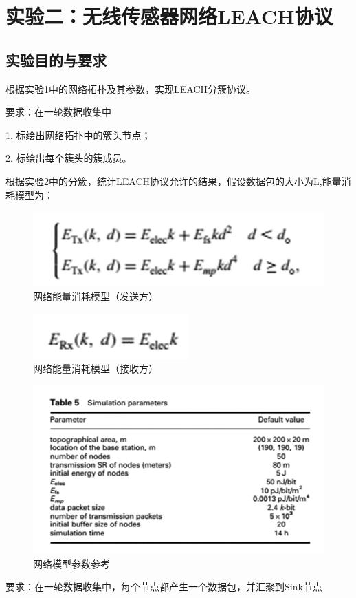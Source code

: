 \documentclass[UTF8]{article} %
\begin{document}
	\section{实验二：无线传感器网络LEACH协议}
	\subsection{实验目的与要求}
	根据实验1中的网络拓扑及其参数，实现LEACH分簇协议。
	
	要求：在一轮数据收集中
	
	1. 标绘出网络拓扑中的簇头节点；
	
	2. 标绘出每个簇头的簇成员。
	
	根据实验2中的分簇，统计LEACH协议允许的结果，假设数据包的大小为L,能量消耗模型为：
	\begin{figure}[H]
		\centering
		\includegraphics[width=0.5\linewidth]{screenshot001}
		\caption{网络能量消耗模型（发送方）}
		\label{fig:screenshot001}
	\end{figure}

	\begin{figure}[H]
		\centering
		\includegraphics[width=0.3\linewidth]{screenshot002}
		\caption{网络能量消耗模型（接收方）}
		\label{fig:screenshot002}
	\end{figure}

	\begin{figure}[H]
		\centering
		\includegraphics[width=0.7\linewidth]{screenshot003}
		\caption{网络模型参数参考}
		\label{fig:screenshot003}
	\end{figure}

	要求：在一轮数据收集中，每个节点都产生一个数据包，并汇聚到Sink节点
	
\end{document}
